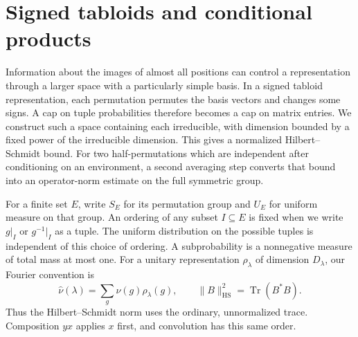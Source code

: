 \section{Signed tabloids and conditional products}
\label{l:sec:tabloid}

Information about the images of almost all positions can control a
representation through a larger space with a particularly simple basis.
In a signed tabloid representation, each permutation permutes the basis
vectors and changes some signs.  A cap on tuple probabilities therefore
becomes a cap on matrix entries.  We construct such a space containing
each irreducible, with dimension bounded by a fixed power of the
irreducible dimension.  This gives a normalized Hilbert--Schmidt bound.
For two half-permutations which are independent after conditioning on an
environment, a second averaging step converts that bound into an
operator-norm estimate on the full symmetric group.

For a finite set $E$, write $S_E$ for its permutation group and $U_E$
for uniform measure on that group.  An ordering of any subset $I\subseteq E$
is fixed when we write $g|_I$ or $g^{-1}|_I$ as a tuple.  The uniform
distribution on the possible tuples is independent of this choice of
ordering.  A subprobability is a nonnegative measure of total mass at
most one.  For a unitary representation $\rho_\lambda$ of dimension
$D_\lambda$, our Fourier convention is
\[
 \widehat\nu(\lambda)=\sum_g\nu(g)\rho_\lambda(g),
 \qquad \|B\|_{\mathrm{HS}}^2=\operatorname{Tr}(B^*B).
\]
Thus the Hilbert--Schmidt norm uses the ordinary, unnormalized trace.
Composition $yx$ applies $x$ first, and convolution has this same order.

